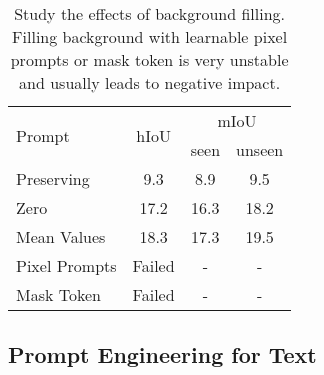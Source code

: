 \documentclass[runningheads]{llncs}
\begin{document}
\begin{table}[]
    \footnotesize
    \centering
    \caption{\footnotesize Study the effects of background filling. Filling background with learnable pixel prompts or mask token is very unstable and usually leads to negative impact. }
    \begin{tabular}{l|c|c|c}
    \toprule
      \multirow{2}{*}{Prompt} & \multirow{2}{*}{hIoU} & \multicolumn{2}{c}{mIoU}\\
      \cline{3-4}
      && seen & unseen\\
      \hline
     Preserving & 9.3&8.9 & 9.5  \\
     Zero & 17.2&16.3&18.2 \\
     Mean Values &18.3&17.3&19.5 \\
     Pixel Prompts &Failed&-&- \\
     Mask Token&Failed&-&- \\ 
     \bottomrule
    \end{tabular}
    \label{tab:bg_fill_result}
    \vspace{-2em}
\end{table}

\subsection{Prompt Engineering for Text}
\end{document}
